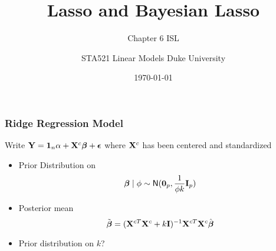 \documentclass[]{beamer}
\title{Lasso and Bayesian Lasso}
\subtitle{Chapter 6 ISL}
\institute{Merlise Clyde}
\author{STA521 Linear Models Duke University}
\date{\today}
\begin{document}
\maketitle

\begin{frame}

\frametitle{Ridge Regression Model}

Write $\mathbf{Y} = \mathbf{1}_n \alpha  + \mathbf{X}^c \boldsymbol{\beta} + \boldsymbol{\epsilon}$
where $\mathbf{X}^c$ has been centered and standardized 
\begin{itemize}
\item 
Prior Distribution on $$\boldsymbol{\beta} \mid \phi \sim \textsf{N}(\mathbf{0}_p, \frac{1}{ \phi
    k} \mathbf{I}_p)$$ \pause

\item Posterior mean
  $$\tilde{\boldsymbol{\beta}} = (\mathbf{X}^{cT}\mathbf{X}^c + k \mathbf{I})^{-1}  \mathbf{X}^{cT}\mathbf{X}^c \hat{\boldsymbol{\beta}}$$ \pause

\item Prior distribution on $k$? 

\end{itemize}

\end{frame}
\end{document}
